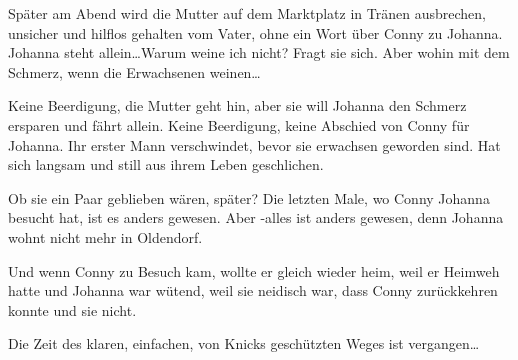 Später am Abend wird die Mutter auf dem Marktplatz in Tränen ausbrechen, unsicher und hilflos gehalten vom Vater, ohne ein Wort über Conny zu Johanna. Johanna steht allein\dots Warum weine ich nicht? Fragt sie sich.
Aber wohin mit  dem Schmerz, wenn die Erwachsenen weinen\dots

Keine Beerdigung, die Mutter geht hin, aber sie will Johanna den Schmerz ersparen und fährt allein. Keine Beerdigung, keine Abschied von Conny für Johanna. Ihr erster Mann verschwindet, bevor sie erwachsen geworden sind. Hat sich langsam und still aus ihrem Leben geschlichen. 

Ob sie ein Paar geblieben wären, später? Die letzten Male, wo Conny Johanna besucht hat, ist es anders gewesen. Aber -alles ist anders gewesen, denn Johanna wohnt nicht mehr in Oldendorf. 

Und wenn Conny zu Besuch kam, wollte er gleich wieder heim, weil er Heimweh hatte und Johanna war wütend, weil sie neidisch war, dass Conny zurückkehren konnte und sie nicht. 

Die Zeit des klaren, einfachen, von Knicks geschützten Weges ist vergangen\dots

